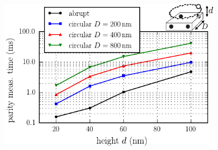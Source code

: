 \begin{figure}[H]
	\includegraphics[width=\linewidth]{../Figures/tau_d_D}
	\caption{}
	\label{FIG:tau}
\end{figure}
